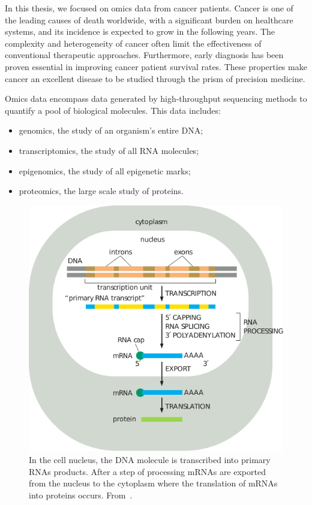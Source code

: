 \documentclass[../main.tex]{subfiles}
\begin{document}
	In this thesis, we focused on omics data from cancer patients.
	Cancer is one of the leading causes of death worldwide, with a significant burden on healthcare systems, and its incidence is expected to grow in the following years.
	The complexity and heterogeneity of cancer often limit the effectiveness of conventional therapeutic approaches.
	Furthermore, early diagnosis has been proven essential in improving cancer patient survival rates.
	These properties make cancer an excellent disease to be studied through the prism of precision medicine.

	Omics data encompass data generated by high-throughput sequencing methods to quantify a pool of biological molecules.
	This data includes:
	\begin{itemize}[nosep]
		\item genomics, the study of an organism's entire DNA\@;
		\item transcriptomics, the study of all RNA molecules;
		\item epigenomics, the study of all epigenetic marks;
		\item proteomics, the large scale study of proteins.
	\end{itemize}

	\begin{figure}[htbp]
		\centering
		\includegraphics{gene_expression.pdf}
		\caption{In the cell nucleus, the DNA molecule is transcribed into primary RNAs products. After a step of processing mRNAs are exported from the nucleus to the cytoplasm where the translation of mRNAs into proteins occurs. From~\cite{alberts2022molecular}.}\label{fig:gene_expression}
	\end{figure}
\end{document}
